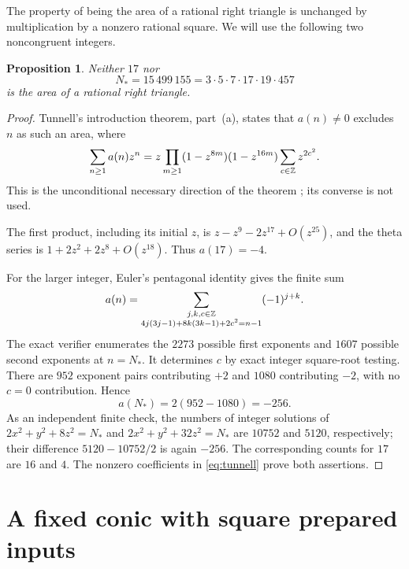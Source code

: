 \documentclass[11pt,a4paper]{article}
\newtheorem{proposition}[theorem]{Proposition}
\theoremstyle{definition}\newtheorem{definition}[theorem]{Definition}
\begin{document}
The property of being the area of a rational right triangle is unchanged
by multiplication by a nonzero rational square. We will use the following
two noncongruent integers.

\begin{proposition}\label{prop:noncongruent}
Neither $17$ nor
\[
                    N_*=15\,499\,155=3\cdot5\cdot7\cdot17\cdot19\cdot457
\]
is the area of a rational right triangle.
\end{proposition}
\begin{proof}
Tunnell's introduction theorem, part~(a), states that $a(n)\ne0$ excludes
$n$ as such an area, where
\begin{equation}\label{eq:tunnell}
 \sum_{n\ge1}a(n)z^n
 =z\prod_{m\ge1}(1-z^{8m})(1-z^{16m})
       \sum_{c\in\mathbb Z}z^{2c^2}.
\end{equation}
This is the unconditional necessary direction of the theorem
\cite[p.~323]{Tunnell}; its converse is not used.

The first product, including its initial $z$, is
$z-z^9-2z^{17}+O(z^{25})$, and the theta series is
$1+2z^2+2z^8+O(z^{18})$. Thus $a(17)=-4$.

For the larger integer, Euler's pentagonal identity gives the finite sum
\begin{equation}\label{eq:finite-sum}
 a(n)=\sum_{\substack{j,k,c\in\mathbb Z\\
      4j(3j-1)+8k(3k-1)+2c^2=n-1}}(-1)^{j+k}.
\end{equation}
The exact verifier enumerates the $2273$ possible first exponents and
$1607$ possible second exponents at $n=N_*$. It determines $c$ by exact
integer square-root testing. There are $952$ exponent pairs contributing
$+2$ and $1080$ contributing $-2$, with no $c=0$ contribution. Hence
\[
                        a(N_*)=2(952-1080)=-256.
\]
As an independent finite check, the numbers of integer solutions of
$2x^2+y^2+8z^2=N_*$ and $2x^2+y^2+32z^2=N_*$ are $10752$ and
$5120$, respectively; their difference $5120-10752/2$ is again $-256$.
The corresponding counts for $17$ are $16$ and $4$. The nonzero
coefficients in \eqref{eq:tunnell} prove both assertions.
\end{proof}

\section{A fixed conic with square prepared inputs}
\end{document}
